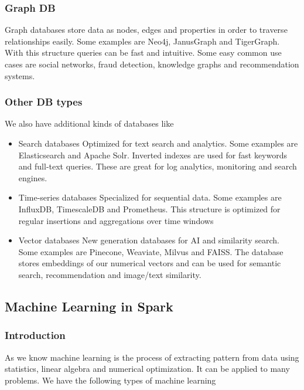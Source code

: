 \subsubsection{Graph DB}

Graph databases store data as nodes, edges and properties in order to traverse relationships easily. Some examples are Neo4j, JanusGraph and TigerGraph. With this structure queries can be fast and intuitive. Some easy common use cases are social networks, fraud detection, knowledge graphs and recommendation systems. 


\subsubsection{Other DB types} 

We also have additional kinds of databases like
\begin{itemize}
    \item Search databases \ra Optimized for text search and analytics. Some examples are Elasticsearch and Apache Solr. Inverted indexes are used for fast keywords and full-text queries. These are great for log analytics, monitoring and search engines.
    \item Time-series databases \ra Specialized for sequential data. Some examples are InfluxDB, TimescaleDB and Prometheus. This structure is optimized for regular insertions and aggregations over time windows
    \item Vector databases \ra New generation databases for AI and similarity search. Some examples are Pinecone, Weaviate, Milvus and FAISS. The database stores embeddings of our numerical vectors and can be used for semantic search, recommendation and image/text similarity.
\end{itemize}

\subsection{Machine Learning in Spark}

\subsubsection{Introduction}

As we know machine learning is the process of extracting pattern from data using statistics, linear algebra and numerical optimization. It can be applied to many problems. We have the following types of machine learning

